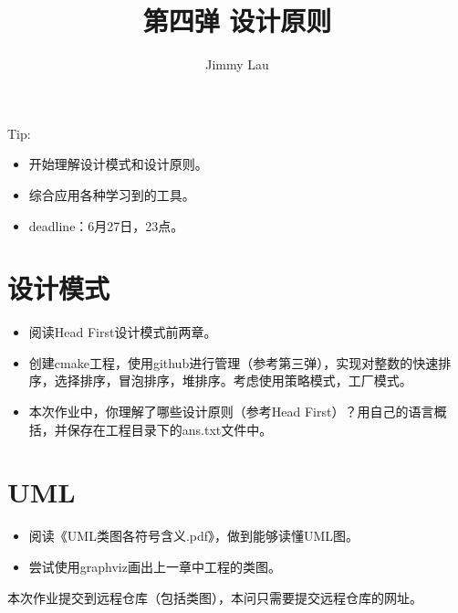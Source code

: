 \documentclass{ctexart}
\begin{document}
  \large
\begin{titlepage}
	\title{\Huge 第四弹 设计原则}
	\author{Jimmy Lau}
	\maketitle
	\thispagestyle{empty}
\end{titlepage}

\tableofcontents
\thispagestyle{empty}
\setcounter{page}{0}
\clearpage

Tip:
\begin{itemize}
\item 开始理解设计模式和设计原则。
\item 综合应用各种学习到的工具。
\item deadline：6月27日，23点。
\end{itemize}

\section{设计模式}
\begin{itemize}
	\item 阅读Head First设计模式前两章。
	\item 创建cmake工程，使用github进行管理（参考第三弹），实现对整数的快速排序，选择排序，冒泡排序，堆排序。考虑使用策略模式，工厂模式。
	\item 本次作业中，你理解了哪些设计原则（参考Head First）？用自己的语言概括，并保存在工程目录下的ans.txt文件中。
\end{itemize}



\section{UML}
\begin{itemize}
	\item 阅读《UML类图各符号含义.pdf》，做到能够读懂UML图。
	\item 尝试使用graphviz画出上一章中工程的类图。
\end{itemize}

本次作业提交到远程仓库（包括类图），本问只需要提交远程仓库的网址。
\end{document}
